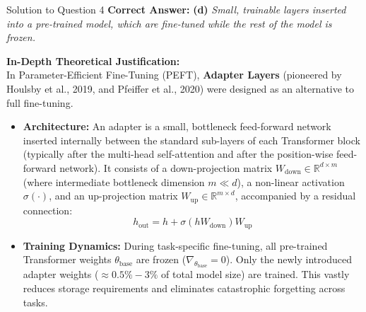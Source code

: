 \documentclass[11pt,a4paper]{article}
\begin{document}
\bigskip

\begin{solutionbox}{Solution to Question 4}
\textbf{Correct Answer:} \textbf{(d)} \textit{Small, trainable layers inserted into a pre-trained model, which are fine-tuned while the rest of the model is frozen.}

\medskip
\textbf{In-Depth Theoretical Justification:}\\
In Parameter-Efficient Fine-Tuning (PEFT), \textbf{Adapter Layers} (pioneered by Houlsby et al., 2019, and Pfeiffer et al., 2020) were designed as an alternative to full fine-tuning. 
\begin{itemize}
    \item \textbf{Architecture:} An adapter is a small, bottleneck feed-forward network inserted internally between the standard sub-layers of each Transformer block (typically after the multi-head self-attention and after the position-wise feed-forward network). It consists of a down-projection matrix $W_{\text{down}} \in \mathbb{R}^{d \times m}$ (where intermediate bottleneck dimension $m \ll d$), a non-linear activation $\sigma(\cdot)$, and an up-projection matrix $W_{\text{up}} \in \mathbb{R}^{m \times d}$, accompanied by a residual connection:
    \[
    h_{\text{out}} = h + \sigma(h W_{\text{down}}) W_{\text{up}}
    \]
    \item \textbf{Training Dynamics:} During task-specific fine-tuning, all pre-trained Transformer weights $\theta_{\text{base}}$ are frozen ($\nabla_{\theta_{\text{base}}} = 0$). Only the newly introduced adapter weights ($\approx 0.5\% - 3\%$ of total model size) are trained. This vastly reduces storage requirements and eliminates catastrophic forgetting across tasks.
\end{itemize}


\end{solutionbox}
\end{document}

